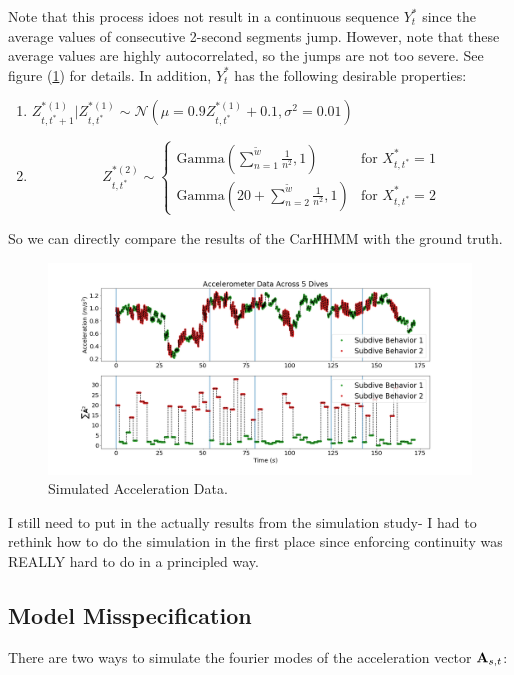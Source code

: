 Note that this process idoes not result in a continuous sequence $Y^*_t$ since the average values of consecutive 2-second segments jump. However, note that these average values are highly autocorrelated, so the jumps are not too severe. See figure (\ref{fig:sim_data}) for details. In addition, $Y^*_t$ has the following desirable properties:

\begin{enumerate}
	\item $Z^{*(1)}_{t,t^*+1} | Z^{*(1)}_{t,t^*} \sim \mathcal{N} \left(\mu = 0.9 Z^{*(1)}_{t,t^*} + 0.1, \sigma^2 = 0.01 \right)$
	\item $$Z^{*(2)}_{t,t^*} \sim \left\{\begin{array}{lr} 
	\text{Gamma}(\sum_{n=1}^{\tilde{w}} \frac{1}{n^2},1) & \text{for } X^*_{t,t^*} = 1 \\
	\text{Gamma}(20 + \sum_{n=2}^{\tilde{w}} \frac{1}{n^2},1) & \text{for } X^*_{t,t^*} = 2
	\end{array}\right. $$
\end{enumerate}

So we can directly compare the results of the CarHHMM with the ground truth.

\begin{figure}[!ht]
	\centering
	\includegraphics[width=5in]{../Plots/sim_data.png}
	\caption{Simulated Acceleration Data.}
	\label{fig:sim_data}
\end{figure}
I still need to put in the actually results from the simulation study- I had to rethink how to do the simulation in the first place since enforcing continuity was REALLY hard to do in a principled way. 

\iffalse
\subsection{Model Misspecification}

There are two ways to simulate the fourier modes of the acceleration vector $\mathbf{A}_{s,t}$:

